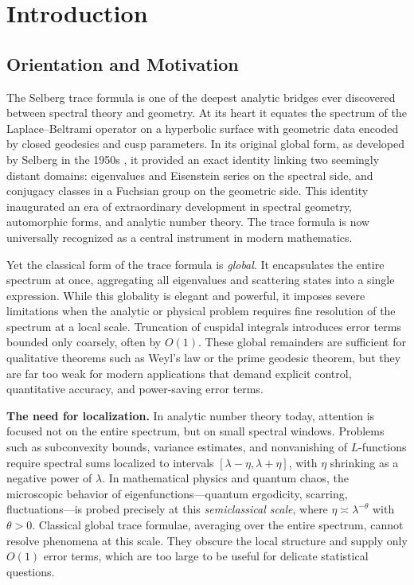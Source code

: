 
\section{Introduction}
\label{sec:introduction}

\subsection*{Orientation and Motivation}

The Selberg trace formula is one of the deepest analytic bridges ever discovered
between spectral theory and geometry. At its heart it equates the spectrum of the
Laplace–Beltrami operator on a hyperbolic surface with geometric data encoded
by closed geodesics and cusp parameters. In its original global form, as
developed by Selberg in the 1950s \cite{Selberg1956}, it provided an exact
identity linking two seemingly distant domains: eigenvalues and Eisenstein
series on the spectral side, and conjugacy classes in a Fuchsian group on the
geometric side. This identity inaugurated an era of extraordinary development
in spectral geometry, automorphic forms, and analytic number theory. The trace
formula is now universally recognized as a central instrument in modern
mathematics.

Yet the classical form of the trace formula is \emph{global}. It encapsulates the
entire spectrum at once, aggregating all eigenvalues and scattering states into
a single expression. While this globality is elegant and powerful, it imposes
severe limitations when the analytic or physical problem requires fine
resolution of the spectrum at a local scale. Truncation of cuspidal integrals
introduces error terms bounded only coarsely, often by $O(1)$. These global
remainders are sufficient for qualitative theorems such as Weyl’s law or the
prime geodesic theorem, but they are far too weak for modern applications that
demand explicit control, quantitative accuracy, and power-saving error terms.

\medskip

\noindent\textbf{The need for localization.}
In analytic number theory today, attention is focused not on the entire
spectrum, but on small spectral windows. Problems such as subconvexity bounds,
variance estimates, and nonvanishing of $L$-functions require spectral sums
localized to intervals $[\lambda-\eta,\lambda+\eta]$, with $\eta$ shrinking as
a negative power of $\lambda$. In mathematical physics and quantum chaos, the
microscopic behavior of eigenfunctions—quantum ergodicity, scarring,
fluctuations—is probed precisely at this \emph{semiclassical scale}, where
$\eta\asymp\lambda^{-\theta}$ with $\theta>0$. Classical global trace
formulae, averaging over the entire spectrum, cannot resolve phenomena at this
scale. They obscure the local structure and supply only $O(1)$ error terms,
which are too large to be useful for delicate statistical questions.

